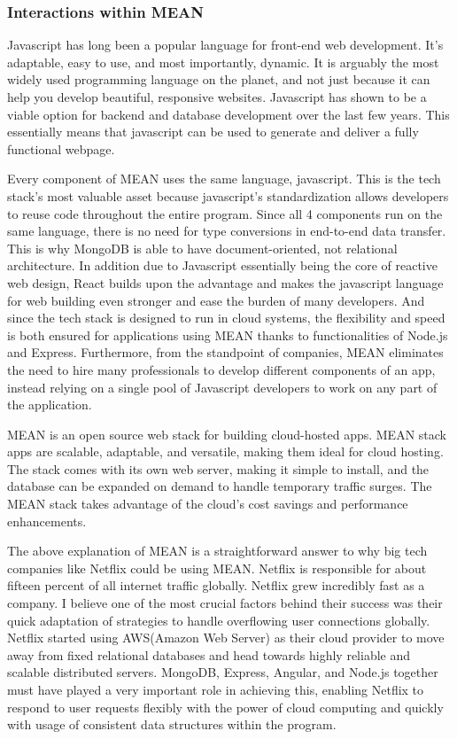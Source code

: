 \documentclass[a4paper, 11pt]{report}
\begin{document}
\subsubsection{Interactions within MEAN}
Javascript has long been a popular language for front-end web development. It's adaptable, easy to use, and most importantly, dynamic. \cite{isaac8}  It is arguably the most widely used programming language on the planet, and not just because it can help you develop beautiful, responsive websites. Javascript has shown to be a viable option for backend and database development over the last few years. \cite{isaac8}  This essentially means that javascript can be used to generate and deliver a fully functional webpage.

Every component of MEAN uses the same language, javascript. This is the tech stack's most valuable asset because javascript's standardization allows developers to reuse code throughout the entire program.\cite{isaac8} Since all 4 components run on the same language, there is no need for type conversions in end-to-end data transfer. This is why MongoDB is able to have document-oriented, not relational architecture. In addition due to Javascript essentially being the core of reactive web design, React builds upon the advantage and makes the javascript language for web building even stronger and ease the burden of many developers. And since the tech stack is designed to run in cloud systems, the flexibility and speed is both ensured for applications using MEAN thanks to functionalities of Node.js and Express.  Furthermore, from the standpoint of companies, MEAN eliminates the need to hire many professionals to develop different components of an app, instead relying on a single pool of Javascript developers to work on any part of the application. \cite{isaac8} 

MEAN is an open source web stack for building cloud-hosted apps. MEAN stack apps are scalable, adaptable, and versatile, making them ideal for cloud hosting.\cite{isaac8} The stack comes with its own web server, making it simple to install, and the database can be expanded on demand to handle temporary traffic surges. \cite{isaac8} The MEAN stack takes advantage of the cloud's cost savings and performance enhancements.\cite{isaac8} 

The above explanation of MEAN is a straightforward answer to why big tech companies like Netflix could be using MEAN. Netflix is responsible for about fifteen percent of all internet traffic globally. Netflix grew incredibly fast as a company. I believe one of the most crucial factors behind their success was their quick adaptation of strategies to handle overflowing user connections globally. Netflix started using AWS(Amazon Web Server) as their cloud provider to move away from fixed relational databases and head towards highly reliable and scalable distributed servers.\cite{isaac11}  MongoDB, Express, Angular, and Node.js together must have played a very important role in achieving this, enabling Netflix to respond to user requests flexibly with the power of cloud computing and quickly with usage of consistent data structures within the program.
\end{document}
